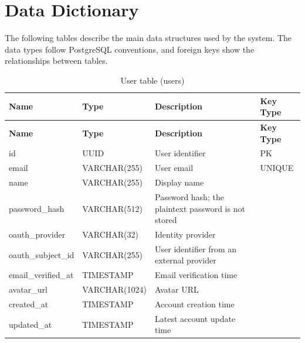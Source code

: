 \section{Data Dictionary}

The following tables describe the main data structures used by the system. The data types follow PostgreSQL conventions, and foreign keys show the relationships between tables.

\begin{longtable}{@{}>{\raggedright\arraybackslash}p{} >{\raggedright\arraybackslash}p{} >{\raggedright\arraybackslash}p{} >{\raggedright\arraybackslash}p{}@{}}
\caption{User table (users)}\label{tab:3-9}\\
\toprule
\textbf{Name} & \textbf{Type} & \textbf{Description} & \textbf{Key Type} \\
\midrule
\endfirsthead
\textbf{Name} & \textbf{Type} & \textbf{Description} & \textbf{Key Type} \\
\midrule
\endhead
id & UUID & User identifier & PK \\
email & VARCHAR(255) & User email & UNIQUE \\
name & VARCHAR(255) & Display name &  \\
password\_hash & VARCHAR(512) & Password hash; the plaintext password is not stored &  \\
oauth\_provider & VARCHAR(32) & Identity provider &  \\
oauth\_subject\_id & VARCHAR(255) & User identifier from an external provider &  \\
email\_verified\_at & TIMESTAMP & Email verification time &  \\
avatar\_url & VARCHAR(1024) & Avatar URL &  \\
created\_at & TIMESTAMP & Account creation time &  \\
updated\_at & TIMESTAMP & Latest account update time &  \\
\bottomrule
\end{longtable}

